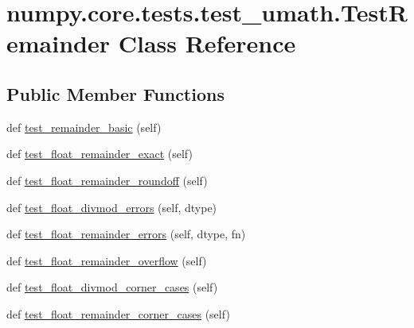 \hypertarget{classnumpy_1_1core_1_1tests_1_1test__umath_1_1TestRemainder}{}\section{numpy.\+core.\+tests.\+test\+\_\+umath.\+Test\+Remainder Class Reference}
\label{classnumpy_1_1core_1_1tests_1_1test__umath_1_1TestRemainder}
\subsection*{Public Member Functions}
\begin{DoxyCompactItemize}
\item 
def \hyperlink{classnumpy_1_1core_1_1tests_1_1test__umath_1_1TestRemainder_ad824adcfa7929e6ae7312227bb6284d5}{test\+\_\+remainder\+\_\+basic} (self)
\item 
def \hyperlink{classnumpy_1_1core_1_1tests_1_1test__umath_1_1TestRemainder_a1a7887d558c01ecae15b7c90da80c24c}{test\+\_\+float\+\_\+remainder\+\_\+exact} (self)
\item 
def \hyperlink{classnumpy_1_1core_1_1tests_1_1test__umath_1_1TestRemainder_ab3351c0d788c4b41331ee2c229105dd1}{test\+\_\+float\+\_\+remainder\+\_\+roundoff} (self)
\item 
def \hyperlink{classnumpy_1_1core_1_1tests_1_1test__umath_1_1TestRemainder_aab4206412e789adfb10aaa3dd041973a}{test\+\_\+float\+\_\+divmod\+\_\+errors} (self, dtype)
\item 
def \hyperlink{classnumpy_1_1core_1_1tests_1_1test__umath_1_1TestRemainder_aecabbeeebd948af884c4ace6aa65ed92}{test\+\_\+float\+\_\+remainder\+\_\+errors} (self, dtype, fn)
\item 
def \hyperlink{classnumpy_1_1core_1_1tests_1_1test__umath_1_1TestRemainder_ad10ba9458754556f28de19fc8c8a2a77}{test\+\_\+float\+\_\+remainder\+\_\+overflow} (self)
\item 
def \hyperlink{classnumpy_1_1core_1_1tests_1_1test__umath_1_1TestRemainder_a144a1eee3242f80a619202b32b810ee8}{test\+\_\+float\+\_\+divmod\+\_\+corner\+\_\+cases} (self)
\item 
def \hyperlink{classnumpy_1_1core_1_1tests_1_1test__umath_1_1TestRemainder_a2771401b833142a018b8bb6215832df7}{test\+\_\+float\+\_\+remainder\+\_\+corner\+\_\+cases} (self)
\end{DoxyCompactItemize}


